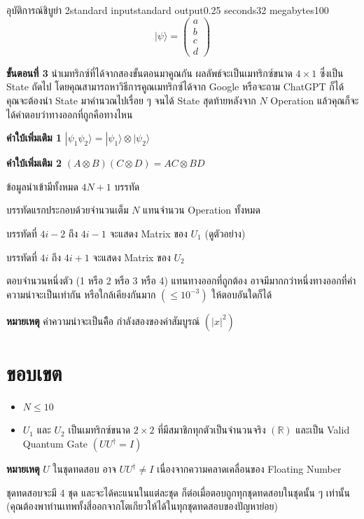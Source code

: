 \documentclass[11pt,a4paper]{article}
\begin{document}
\begin{problem}{อุบัติการณ์ชิบูย่า 2}{standard input}{standard output}{0.25 seconds}{32 megabytes}{100}
$$|\psi\rangle = \begin{pmatrix}
a \\
b \\
c \\
d
\end{pmatrix}$$

\textbf{ขั้นตอนที่ 3} นำเมทริกซ์ที่ได้จากสองขั้นตอนมาคูณกัน ผลลัพธ์จะเป็นเมทริกซ์ขนาด $4\times1$ ซึ่งเป็น State ถัดไป โดยคุณสามารถหาวิธีการคูณเมทริกซ์ได้จาก Google หรือจะถาม ChatGPT ก็ได้ คุณจะต้องนำ State มาคำนวณไปเรื่อย ๆ จนได้ State สุดท้ายหลังจาก $N$ Operation แล้วคุณก็จะได้คำตอบว่าทางออกที่ถูกคือทางไหน

\textbf{คำใบ้เพิ่มเติม 1} $|\psi_1\psi_2\rangle = |\psi_1\rangle \otimes |\psi_2\rangle$

\textbf{คำใบ้เพิ่มเติม 2} $(A \otimes B)(C \otimes D) = AC \otimes BD$

\InputFile
ข้อมูลนำเข้ามีทั้งหมด $4N+1$ บรรทัด

บรรทัดแรกประกอบด้วยจำนวนเต็ม $N$ แทนจำนวน Operation ทั้งหมด

บรรทัดที่ $4i - 2$ ถึง $4i - 1$ จะแสดง Matrix ของ $U_1$ (ดูตัวอย่าง)

บรรทัดที่ $4i$ ถึง $4i + 1$ จะแสดง Matrix ของ $U_2$

\OutputFile
ตอบจำนวนหนึ่งตัว (1 หรือ 2 หรือ 3 หรือ 4) แทนทางออกที่ถูกต้อง อาจมีมากกว่าหนึ่งทางออกที่ค่าความน่าจะเป็นเท่ากัน หรือใกล้เคียงกันมาก $(\le 10^{-3})$ ให้ตอบอันใดก็ได้

\textbf{หมายเหตุ} ค่าความน่าจะเป็นคิือ กำลังสองของค่าสัมบูรณ์ $(|x|^2)$

\section*{ขอบเขต}

\begin{itemize}
\item $N \le 10$
\item $U_1$ และ $U_2$ เป็นเมทริกซ์ขนาด $2\times2$ ที่มีสมาชิกทุกตัวเป็นจำนวนจริง $(\mathbb{R})$ และเป็น Valid Quantum Gate $(UU^\dagger = I)$
\end{itemize}

\textbf{หมายเหตุ} $U$ ในชุดทดสอบ อาจ $UU^\dagger \neq I$ เนื่องจากความคลาดเคลื่อนของ Floating Number

\Scoring
ชุดทดสอบจะมี 4 ชุด และจะได้คะแนนในแต่ละชุด ก็ต่อเมื่อตอบถูกทุกชุดทดสอบในชุดนั้น ๆ เท่านั้น (คุณต้องพาท่านเทพทั้งสี่ออกจากโตเกียวให้ได้ในทุกชุดทดสอบของปัญหาย่อย)

\begin{description}


\end{description}
\end{problem}
\end{document}
